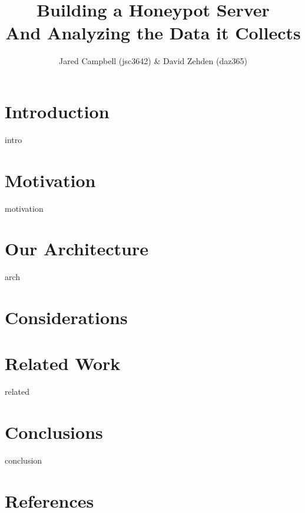 \documentclass{sig-alternate}
\newcommand{\ignore}[1]{}
\begin{document}
\title{ Building a Honeypot Server \\And Analyzing the Data it Collects}
\author{Jared Campbell (jsc3642) \& David Zehden (daz365)}


\maketitle

\begin{abstract}
 
\end{abstract}

\section{Introduction}
\label{sec:intro}
 {intro}

\section{Motivation}
\label{sec:motivation}
 {motivation}

\ignore{Sometimes background is merged into motivation, and is not required separately.}

\section{Our Architecture}
\label{sec:arch}
 {arch}

\section{Considerations}
\label{sec:considerations}


\section{Related Work}
\label{sec:related}
 {related}

\section{Conclusions}
\label{sec:conclusion}
 {conclusion}

\section{References}
\end{document}
